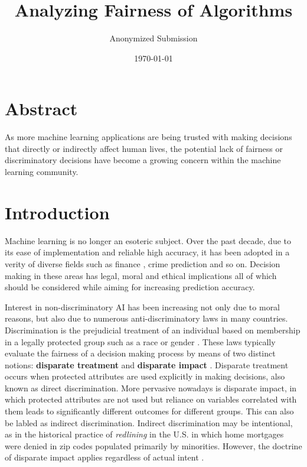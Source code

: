 \documentclass[11pt]{article}
\begin{document}
\title{Analyzing Fairness of Algorithms}
\author{Anonymized Submission}
\date{\today}
\maketitle

\section{Abstract}
As more machine learning applications are being trusted with making decisions that directly or indirectly affect human lives, the potential lack of fairness or discriminatory decisions have become a growing concern within the machine learning community.

\section{Introduction} \label{sec:intro}
Machine learning is no longer an esoteric subject. Over the past decade, due to its ease of implementation and reliable high accuracy, it has been adopted in a verity of diverse fields such as finance  \cite{huang2007credit, tsai2008using, galindo2000credit}, crime prediction \cite{brennan2009evaluating} and so on. Decision making in these areas has legal, moral and ethical implications all of which should be considered while aiming for increasing prediction accuracy.

Interest in non-discriminatory AI has been increasing not only due to moral reasons, but also due to numerous anti-discriminatory laws in many countries. Discrimination is the prejudicial treatment of an individual based on membership in a legally protected group such as a race or gender \cite{calmon2017optimized}. These laws typically evaluate the fairness of a decision making process by means of two distinct notions: \textbf{disparate treatment} and \textbf{disparate impact} \cite{zafar2017fairness}. Disparate treatment occurs when protected attributes are used explicitly in making decisions, also known as direct discrimination. More pervasive nowadays is disparate impact, in which protected attributes are not used but reliance on variables correlated with them leads to significantly different outcomes for different groups. This can also be labled as indirect discrimination. Indirect discrimination may be intentional, as in the historical practice of \textit{redlining} in the U.S. in which home mortgages were denied in zip codes populated primarily by minorities. However, the doctrine of disparate impact applies regardless of actual intent \cite{calmon2017optimized}.
\end{document}
